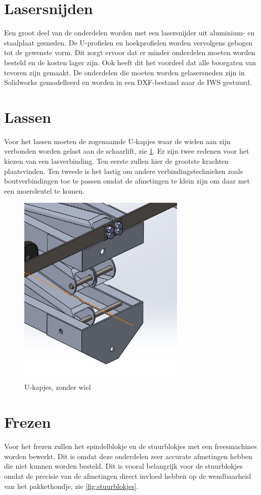 \section{Lasersnijden}
\label{se:lasersnijden}
Een groot deel van de onderdelen worden met een lasersnijder uit aluminium- en staalplaat gesneden. De U-profielen en hoekprofielen worden vervolgens gebogen tot de gewenste vorm. Dit zorgt ervoor dat er minder onderdelen moeten worden besteld en de kosten lager zijn. Ook heeft dit het voordeel dat alle boorgaten van tevoren zijn gemaakt. De onderdelen die moeten worden gelasersneden zijn in Solidworks gemodelleerd en worden in een DXF-bestand naar de IWS gestuurd.

\section{Lassen}
\label{se:Lassen}
Voor het lassen moeten de zogenaamde U-kapjes waar de wielen aan zijn verbonden worden gelast aan de schaarlift, zie \cref{fig:U-kapjes}. Er zijn twee redenen voor het kiezen van een lasverbinding. Ten eerste zullen hier de grootste krachten plaatsvinden. Ten tweede is het lastig om andere verbindingstechnieken zoals boutverbindingen toe te passen omdat de afmetingen te klein zijn om daar met een moersleutel te komen.

\begin{figure}[H]
    \includegraphics[width = 80mm]{04_vervaardigingsplan/U-kapjes.JPG}
    \caption{U-kapjes, zonder wiel}
    \label{fig:U-kapjes}
\end{figure}

\section{Frezen}
\label{se:Frezen}
Voor het frezen zullen het spindelblokje en de stuurblokjes met een freesmachines worden bewerkt. Dit is omdat deze onderdelen zeer accurate afmetingen hebben die niet kunnen worden besteld. Dit is vooral belangrijk voor de stuurblokjes omdat de precisie van de afmetingen direct invloed hebben op de wendbaarheid van het pakkethondje, zie \cref{fig:stuurblokjes}.


